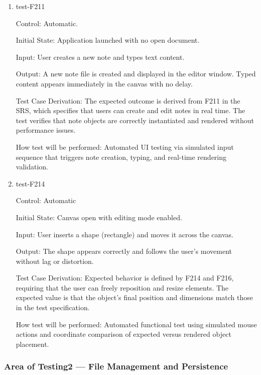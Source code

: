 \documentclass[12pt, titlepage]{article}
\begin{document}
\begin{enumerate}

\item{test-F211\\}

Control: Automatic.

Initial State: Application launched with no open document.

Input: User creates a new note and types text content.

Output: 
A new note file is created and displayed in the editor window. Typed content appears
immediately in the canvas with no delay.

Test Case Derivation: 
The expected outcome is derived from F211 in the SRS, which specifies that users can create and edit notes in real time.
The test verifies that note objects are correctly instantiated and rendered without performance issues.

How test will be performed: Automated UI testing via simulated input sequence that triggers note creation, typing,
and real-time rendering validation.

\item{test-F214\\}

Control: Automatic

Initial State: Canvas open with editing mode enabled.

Input: User inserts a shape (rectangle) and moves it across the canvas.

Output: 
The shape appears correctly and follows the user’s movement without lag or distortion.

Test Case Derivation: 
Expected behavior is defined by F214 and F216, requiring that the user can freely reposition and resize elements.
The expected value is that the object’s final position and dimensions match those in the test specification.

How test will be performed: Automated functional test using simulated mouse actions and coordinate comparison of
expected versus rendered object placement.

\end{enumerate}

\subsubsection{Area of Testing2 — File Management and Persistence}
\end{document}
